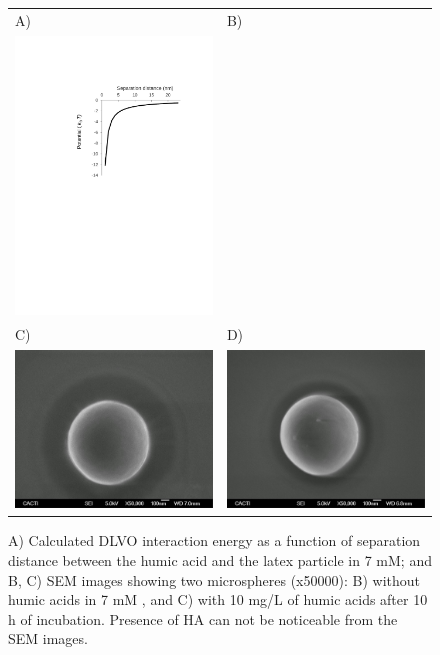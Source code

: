 \documentclass[journal=langd5,manuscript=article]{achemso}
\begin{document}
 \begin{figure}
 \begin{tabular}{|l|l|}
 \hline
  A) & B)\\
  \includegraphics[width=0.49\linewidth]
  {Figures/HA_MS_Laura_DLVO.pdf} & %
  \\
 \hline 
  C) & D)\\
  \includegraphics[width=0.49\linewidth]
  {Figures/4-052.jpg} & \includegraphics[width=0.49\linewidth]{Figures/5-063.jpg}\\
 \hline
  \end{tabular}
  \caption{A) Calculated DLVO interaction energy as a function of separation distance between the humic acid and the latex particle in  7 mM; and B, C) SEM images showing two microspheres (x50000): B) without humic acids in 7 mM , and C)  with 10 mg/L of humic acids after 10 h of incubation. Presence of HA can not be noticeable from the SEM images.} 
  \label{fgr:SEM_50000X}
\end{figure}
\end{document}

